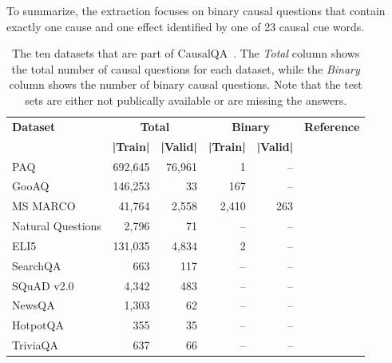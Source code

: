 To summarize, the extraction focuses on binary causal questions that contain 
exactly one cause and one effect identified by one of 23 causal cue words.

%
\begin{table}
\centering
\caption{The ten datasets that are part of CausalQA~\cite{Bondarenko2022CausalQA}. The
		\textit{Total} column shows the total number of causal questions for each dataset, 
		while the \textit{Binary} column shows the number of binary causal questions.
		Note that the test sets are either not publically available or 
		are missing the answers.}
\label{table-causal-datasets}
	\begin{tabular}{lrrrrr} 
		\toprule
		\textbf{Dataset} & \multicolumn{2}{c}{\textbf{Total}} & \multicolumn{2}{c}{\textbf{Binary}} & \textbf{Reference} \\
		\cmidrule(lr{.6em}){2-3} \cmidrule(l{0.4em}){4-5}
		&\textbf{|Train|} & \textbf{|Valid|} & \textbf{|Train|} & \textbf{|Valid|} & \\
		\midrule
		PAQ & 692,645 & 76,961 & 1 & --  & \cite{Lewis2021PAQ}\\ 
		GooAQ & 146,253 & 33 & 167 & -- &  \cite{khashabi:2021}\\
		MS MARCO & 41,764 & 2,558 & 2,410 & 263 & \cite{nguyen:2016} \\
		Natural Questions & 2,796 & 71 & -- & -- & \cite{kwiatkowski:2019}\\
		ELI5 & 131,035 & 4,834 & 2 & --  & \cite{fan:2019}\\
		SearchQA &663 & 117 & -- & -- & \cite{dunn:2017}\\
		SQuAD v2.0 & 4,342 & 483 & -- & -- & \cite{rajpurkar:2018}\\
		NewsQA &1,303 & 62 & -- & -- & \cite{trischler:2017}\\
		HotpotQA &355& 35 & -- & -- & \cite{yang:2018}\\
		TriviaQA & 637 & 66 & -- & -- & \cite{joshi:2017} \\
		\bottomrule
	\end{tabular}
\end{table}
